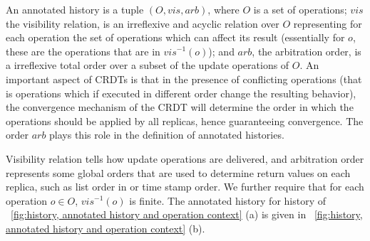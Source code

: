 An annotated history is a tuple $(O,\mathit{vis},\mathit{arb})$, where
$O$ is a set of operations; $\mathit{vis}$ the visibility relation, is
an irreflexive and acyclic relation over $O$ representing for each
operation the set of operations which can affect its result
(essentially for $o$, these are the operations that are in
$\mathit{vis}^{-1}(o)$); and $\mathit{arb}$, the arbitration order, is
a irreflexive total order over a subset of the update operations of
$O$.
An important aspect of CRDTs is that in the presence of conflicting
operations (that is operations which if executed in different order
change the resulting behavior), the convergence mechanism of the CRDT
will determine the order in which the operations should be applied by
all replicas, hence guaranteeing convergence.
The order $\mathit{arb}$ plays this role in the definition of
annotated histories.
%

{\color {red} Visibility relation tells how update operations are
  delivered, and arbitration order represents some global orders that
  are used to determine return values on each replica, such as list
  order in \cite{Attiya:2016} or time stamp order.}
We further require that for each operation $o \in O$, $\mathit{vis}^{-1}(o)$ is finite.
{\color {red}The annotated history for history of \figurename~\ref{fig:history, annotated history and operation context} (a) is given in \figurename~\ref{fig:history, annotated history and operation context} (b).} %




